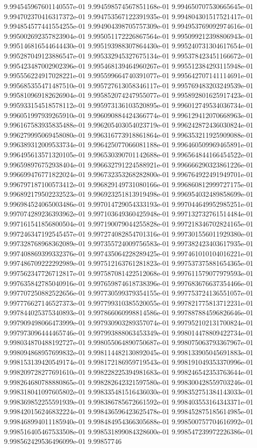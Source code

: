 	9.994545967601140557e-01	9.994598574567851168e-01	9.994650707530665645e-01	9.994702370416317372e-01	9.994753567122391935e-01	9.994804301517521417e-01	9.994854577441554255e-01	9.994904398705757309e-01	9.994953769092974616e-01	9.995002692357823904e-01	9.995051172226867564e-01	9.995099212398806943e-01	9.995146816544644430e-01	9.995193988307864430e-01	9.995240731304617654e-01	9.995287049123886547e-01	9.995332945327675134e-01	9.995378423451166672e-01	9.995423487002902396e-01	9.995468139464960267e-01	9.995512384293115948e-01	9.995556224917028221e-01	9.995599664740391077e-01	9.995642707141114691e-01	9.995685355471487510e-01	9.995727613058346117e-01	9.995769483203249539e-01	9.995810969182626904e-01	9.995852074247955077e-01	9.995892801625917423e-01	9.995933154518578112e-01	9.995973136103520895e-01	9.996012749534036734e-01	9.996051997939265910e-01	9.996090884424366774e-01	9.996129412070668963e-01	9.996167583935835488e-01	9.996205403054023719e-01	9.996242872436030824e-01	9.996279995069458080e-01	9.996316773918861864e-01	9.996353211925909088e-01	9.996389312009533734e-01	9.996425077066081188e-01	9.996460509969465891e-01	9.996495613571320105e-01	9.996530390701142688e-01	9.996564844166454522e-01	9.996598976752938404e-01	9.996632791224588921e-01	9.996666290323861226e-01	9.996699476771822024e-01	9.996732353268282800e-01	9.996764922491949701e-01	9.996797187100573412e-01	9.996829149731080166e-01	9.996860812999727175e-01	9.996892179502232523e-01	9.996923251813919498e-01	9.996954032489858699e-01	9.996984524065003486e-01	9.997014729054333193e-01	9.997044649952985251e-01	9.997074289236393962e-01	9.997103649360425948e-01	9.997132732761514484e-01	9.997161541856800504e-01	9.997190079044255828e-01	9.997218346702824165e-01	9.997246347192545457e-01	9.997274082854701316e-01	9.997301556011929380e-01	9.997328768968362089e-01	9.997355724009756583e-01	9.997382423403617935e-01	9.997408869399332376e-01	9.997435064228289425e-01	9.997461010104016221e-01	9.997486709222292989e-01	9.997512163761281823e-01	9.997537375881654365e-01	9.997562347726712817e-01	9.997587081422512068e-01	9.997611579077979593e-01	9.997635842785040916e-01	9.997659874618738396e-01	9.997683676637354466e-01	9.997707250882522656e-01	9.997730599379354155e-01	9.997753724136551057e-01	9.997776627146527373e-01	9.997799310385520055e-01	9.997821775813712231e-01	9.997844025375340893e-01	9.997866060998814586e-01	9.997887884596826646e-01	9.997909498066473999e-01	9.997930903289357074e-01	9.997952102131700824e-01	9.997973096444465746e-01	9.997993888063453349e-01	9.998014478809422734e-01	9.998034870488192727e-01	9.998055064890750687e-01	9.998075063793367967e-01	9.998094868957699832e-01	9.998114482130892045e-01	9.998133905045691883e-01	9.998153139420549174e-01	9.998172186959719543e-01	9.998191049353370996e-01	9.998209728277691610e-01	9.998228225394981683e-01	9.998246542353763644e-01	9.998264680788880865e-01	9.998282642321597580e-01	9.998300428559703246e-01	9.998318041097605802e-01	9.998335481516436030e-01	9.998352751384143033e-01	9.998369852255591939e-01	9.998386785672661592e-01	9.998403553164343371e-01	9.998420156246832224e-01	9.998436596423625478e-01	9.998452875185614985e-01	9.998468994011185940e-01	9.998484954366305688e-01	9.998500757704616992e-01	9.998516405467533508e-01	9.998531899084328600e-01	9.998547239972226386e-01	9.998562429536496099e-01	9.99857746